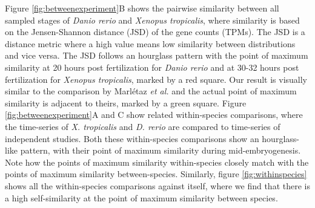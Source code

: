 Figure \ref{fig:betweenexperiment}B shows the pairwise similarity between all sampled stages of \textit{Danio rerio} and \textit{Xenopus tropicalis}, where similarity is based on the Jensen-Shannon distance (JSD) of the gene counts (TPMs). The JSD is a distance metric where a high value means low similarity between distributions and vice versa. The JSD follows an hourglass pattern with the point of maximum similarity at 20 hours post fertilization for \textit{Danio rerio} and at 30-32 hours post fertilization for \textit{Xenopus tropicalis}, marked by a red square. Our result is visually similar to the comparison by Marl\'etaz \textit{et al.} and the actual point of maximum similarity is adjacent to theirs, marked by a green square. Figure \ref{fig:betweenexperiment}A and C show related within-species comparisons, where the time-series of \textit{X. tropicalis} and \textit{D. rerio} are compared to time-series of independent studies\cite{Hu2017,White2017}. Both these within-species comparisons show an hourglass-like pattern, with their point of maximum similarity during mid-embryogenesis. Note how the points of maximum similarity within-species closely match with the points of maximum similarity between-species. Similarly, figure \ref{fig:withinspecies} shows all the within-species comparisons against itself, where we find that there is a high self-similarity at the point of maximum similarity between species. 

